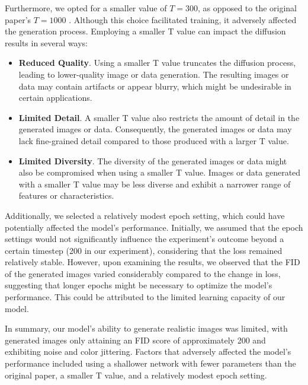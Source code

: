 \documentclass[letterpaper]{article} %
\begin{document}
Furthermore, we opted for a smaller value of $T = 300$, as opposed to the original paper's $T = 1000$ \cite{2020denoising}. Although this choice facilitated training, it adversely affected the generation process. Employing a smaller T value can impact the diffusion results in several ways:

\begin{itemize}
\item \textbf{Reduced Quality}. Using a smaller T value truncates the diffusion process, leading to lower-quality image or data generation. The resulting images or data may contain artifacts or appear blurry, which might be undesirable in certain applications.
\item \textbf{Limited Detail}. A smaller T value also restricts the amount of detail in the generated images or data. Consequently, the generated images or data may lack fine-grained detail compared to those produced with a larger T value.
\item \textbf{Limited Diversity}. The diversity of the generated images or data might also be compromised when using a smaller T value. Images or data generated with a smaller T value may be less diverse and exhibit a narrower range of features or characteristics.
\end{itemize}

Additionally, we selected a relatively modest epoch setting, which could have potentially affected the model's performance. Initially, we assumed that the epoch settings would not significantly influence the experiment's outcome beyond a certain timestep (200 in our experiment), considering that the loss remained relatively stable. However, upon examining the results, we observed that the FID of the generated images varied considerably compared to the change in loss, suggesting that longer epochs might be necessary to optimize the model's performance. This could be attributed to the limited learning capacity of our model.

In summary, our model's ability to generate realistic images was limited, with generated images only attaining an FID score of approximately 200 and exhibiting noise and color jittering. Factors that adversely affected the model's performance included using a shallower network with fewer parameters than the original paper, a smaller T value, and a relatively modest epoch setting.
\end{document}
